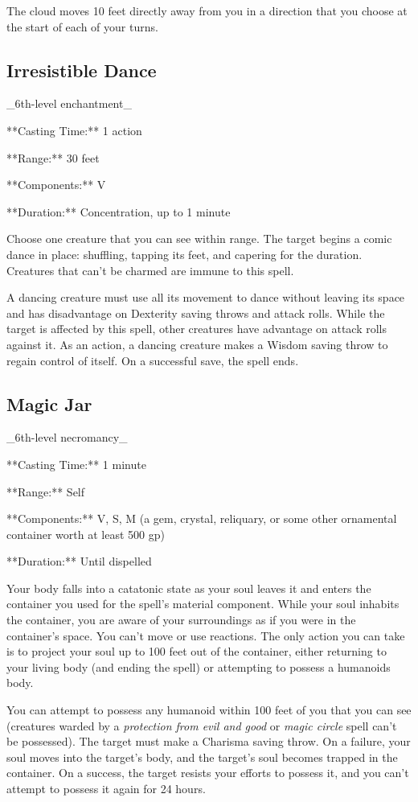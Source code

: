 The cloud moves 10 feet directly away from you in a direction that you choose at the start of each of your turns.

\subsection{Irresistible Dance}

_6th-level enchantment_

**Casting Time:** 1 action

**Range:** 30 feet

**Components:** V

**Duration:** Concentration, up to 1 minute

Choose one creature that you can see within range. The target begins a comic dance in place: shuffling, tapping its feet, and capering for the duration. Creatures that can’t be charmed are immune to this spell.

A dancing creature must use all its movement to dance without leaving its space and has disadvantage on Dexterity saving throws and attack rolls. While the target is affected by this spell, other creatures have advantage on attack rolls against it. As an action, a dancing creature makes a Wisdom saving throw to regain control of itself. On a successful save, the spell ends.

\subsection{Magic Jar}

_6th-level necromancy_

**Casting Time:** 1 minute

**Range:** Self

**Components:** V, S, M (a gem, crystal, reliquary, or some other ornamental container worth at least 500 gp)

**Duration:** Until dispelled

Your body falls into a catatonic state as your soul leaves it and enters the container you used for the spell’s material component. While your soul inhabits the container, you are aware of your surroundings as if you were in the container’s space. You can’t move or use reactions. The only action you can take is to project your soul up to 100 feet out of the container, either returning to your living body (and ending the spell) or attempting to possess a humanoids body.

You can attempt to possess any humanoid within 100 feet of you that you can see (creatures warded by a \textit{protection from evil and good} or \textit{magic circle} spell can’t be possessed). The target must make a Charisma saving throw. On a failure, your soul moves into the target’s body, and the target’s soul becomes trapped in the container. On a success, the target resists your efforts to possess it, and you can’t attempt to possess it again for 24 hours.

